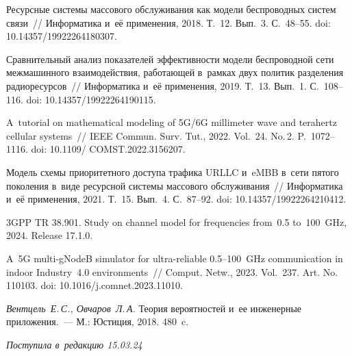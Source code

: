 \begin{multicols}{2}
{{\begin{thebibliography}{99}
Ресурсные системы массового обслуживания как модели беспроводных сис\-тем связи~//
Информатика и~её применения, 2018. Т.~12. Вып.~3. С.~48--55.
doi: 10.14357/19922264180307.

Сравнительный анализ показателей эффективности модели беспроводной сети 
межмашинного взаимодействия, работающей в~рамках двух политик разделения 
радиоресурсов~//
Информатика и~её применения, 2019. Т.~13. Вып.~1. С.~108--116.
doi: 10.14357/19922264190115.

A~tutorial on mathematical modeling of 5G/6G millimeter wave and terahertz 
cellular systems~//
IEEE Commun. Surv.  Tut., 2022. Vol.~24. No.\,2. P.~1072--1116.
doi: 10.1109/ COMST.2022.3156207.



Модель схемы приоритетного доступа трафика URLLC и~eMBB в~сети пятого поколения в~виде ресурсной сис\-те\-мы массового обслуживания~//
Информатика и~её применения, 2021. Т.~15. Вып.~4. С.~87--92.
doi: 10.14357/19922264210412.

3GPP TR 38.901. Study on channel model for frequencies from~0.5 to~100~GHz, 
2024. Release 17.1.0.

A~5G multi-gNodeB simulator for ultra-reliable 0.5--100~GHz communication in 
indoor Industry~4.0 environments~//
Comput. Netw., 2023. Vol.~237. Art. No.\,110103.
doi: 10.1016/j.comnet.2023.11010.

\textit{Вентцель~Е.\,С., Овчаров~Л.\,А.}
Теория вероятностей и~ее инженерные приложения.~--- М.: Юстиция, 
2018. 480~c.

\end{thebibliography}

 }
 }

\end{multicols}

\vspace*{-10pt}

\hfill{\small\textit{Поступила в~редакцию 15.03.24}}

